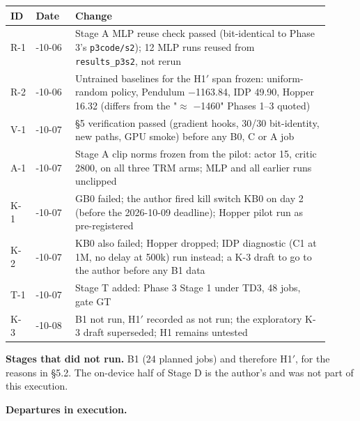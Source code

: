 \documentclass[11pt]{article}
\begin{document}
\begin{center}\small\begin{tabular}{>{\raggedright\arraybackslash}p{0.079\linewidth}>{\raggedright\arraybackslash}p{0.115\linewidth}>{\raggedright\arraybackslash}p{0.712\linewidth}}
\toprule
ID & Date & Change \\
\midrule
R-1 & 2026-10-06 & Stage A MLP reuse check passed (bit-identical to Phase 3's \texttt{p3code/s2}); 12 MLP runs reused from \texttt{results\_p3s2}, not rerun \\
R-2 & 2026-10-06 & Untrained baselines for the H1$'$ span frozen: uniform-random policy, Pendulum $-$1163.84, IDP 49.90, Hopper 16.32 (differs from the "$\approx$ $-$1460" Phases 1--3 quoted) \\
V-1 & 2026-10-07 & \S{}5 verification passed (gradient hooks, 30/30 bit-identity, new paths, GPU smoke) before any B0, C or A job \\
A-1 & 2026-10-07 & Stage A clip norms frozen from the pilot: actor 15, critic 2800, on all three TRM arms; MLP and all earlier runs unclipped \\
K-1 & 2026-10-07 & GB0 failed; the author fired kill switch KB0 on day 2 (before the 2026-10-09 deadline); Hopper pilot run as pre-registered \\
K-2 & 2026-10-07 & KB0 also failed; Hopper dropped; IDP diagnostic (C1 at 1M, no delay at 500k) run instead; a K-3 draft to go to the author before any B1 data \\
T-1 & 2026-10-07 & Stage T added: Phase 3 Stage 1 under TD3, 48 jobs, gate GT \\
K-3 & 2026-10-08 & B1 not run, H1$'$ recorded as not run; the exploratory K-3 draft superseded; H1 remains untested \\
\bottomrule
\end{tabular}\end{center}



\textbf{Stages that did not run.} B1 (24 planned jobs) and therefore H1$'$, for the reasons in \S{}5.2. The on-device half of Stage D is the author's and was not part of this execution.



\textbf{Departures in execution.}
\end{document}

